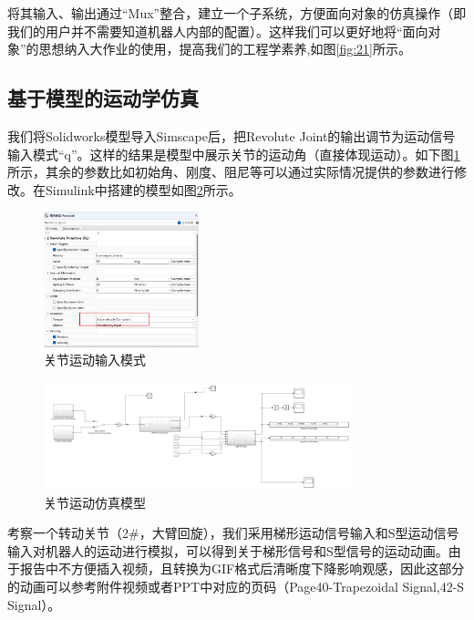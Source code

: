 将其输入、输出通过“Mux”整合，建立一个子系统，方便面向对象的仿真操作（即我们的用户并不需要知道机器人内部的配置）。这样我们可以更好地将“面向对象”的思想纳入大作业的使用，提高我们的工程学素养,如图\ref{fig:21}所示。



\subsection{基于模型的运动学仿真}
我们将Solidworks模型导入Simscape后，把Revolute Joint的输出调节为运动信号输入模式“q”。这样的结果是模型中展示关节的运动角（直接体现运动）。如下图\ref{fig:22}所示，其余的参数比如初始角、刚度、阻尼等可以通过实际情况提供的参数进行修改。在Simulink中搭建的模型如图\ref{fig:23}所示。

\begin{figure}[htbp]
    \centering
    \includegraphics[width=0.4\textwidth]{Image/motion.png}
    \caption{关节运动输入模式}
    \label{fig:22}
\end{figure}

\begin{figure}[htbp]
    \centering
    \includegraphics[width=0.8\textwidth]{Image/sim-motion.png}
    \caption{关节运动仿真模型}
    \label{fig:23}
\end{figure}

考察一个转动关节（2\#，大臂回旋），我们采用梯形运动信号输入和S型运动信号输入对机器人的运动进行模拟，可以得到关于梯形信号和S型信号的运动动画。由于报告中不方便插入视频，且转换为GIF格式后清晰度下降影响观感，因此这部分的动画可以参考附件视频或者PPT中对应的页码（Page40-Trapezoidal Signal,42-S Signal）。

